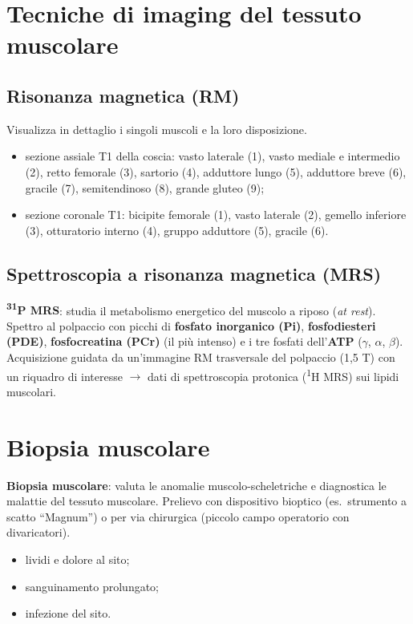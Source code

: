 \section{Tecniche di imaging del tessuto muscolare}

\subsection{Risonanza magnetica (RM)}
Visualizza in dettaglio i singoli muscoli e la loro disposizione.
\begin{itemize}
  \item sezione assiale T1 della coscia: vasto laterale (1), vasto mediale e intermedio (2), retto
    femorale (3), sartorio (4), adduttore lungo (5), adduttore breve (6), gracile (7), semitendinoso
    (8), grande gluteo (9);
  \item sezione coronale T1: bicipite femorale (1), vasto laterale (2), gemello inferiore (3),
    otturatorio interno (4), gruppo adduttore (5), gracile (6).
\end{itemize}

\subsection{Spettroscopia a risonanza magnetica (MRS)}
\textbf{\textsuperscript{31}P MRS}: studia il metabolismo energetico del muscolo a riposo
(\textit{at rest}). Spettro al polpaccio con picchi di \textbf{fosfato inorganico (Pi)},
\textbf{fosfodiesteri (PDE)}, \textbf{fosfocreatina (PCr)} (il più intenso) e i tre fosfati
dell'\textbf{ATP} ($\gamma$, $\alpha$, $\beta$). Acquisizione guidata da un'immagine RM trasversale
del polpaccio (1,5 T) con un riquadro di interesse $\rightarrow$ dati di spettroscopia protonica
(\textsuperscript{1}H MRS) sui lipidi muscolari.

\section{Biopsia muscolare}

\textbf{Biopsia muscolare}: valuta le anomalie muscolo-scheletriche e diagnostica le malattie del
tessuto muscolare. Prelievo con dispositivo bioptico (es.\ strumento a scatto ``Magnum'') o per via
chirurgica (piccolo campo operatorio con divaricatori).

\begin{itemize}
  \item lividi e dolore al sito;
  \item sanguinamento prolungato;
  \item infezione del sito.
\end{itemize}

